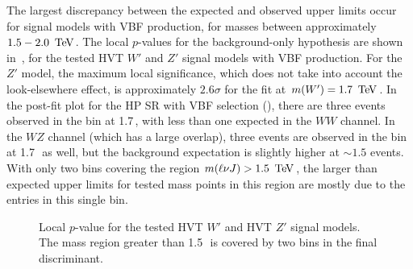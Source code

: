 The largest discrepancy between the expected and observed upper limits occur for signal models with VBF production, for masses between approximately $1.5-2.0\,\TeV$. The local $p$-values for the background-only hypothesis are shown in~\Fig{\ref{fig:p0}},  for the tested HVT $W'$ and $Z'$ signal models with VBF production. For the $Z'$ model, the maximum local significance, which does not take into account the look-elsewhere effect, is approximately $2.6\sigma$ for the fit at $m(W')=1.7\,\TeV$. In the post-fit plot for the HP SR with VBF selection (\Fig{\ref{fig:pf_hp_vbf}}), there are three events observed in the bin at 1.7\,\TeV, with less than one expected in the $WW$ channel. In the $WZ$ channel (which has a large overlap), three events are observed in the bin at 1.7\,\TeV\, as well, but the background expectation is slightly higher at $\sim1.5$ events. With only two bins covering the region $m(\ell\nu J)>1.5\,\TeV$, the larger than expected upper limits for tested mass points in this region are mostly due to the entries in this single bin.


\begin{figure}[H]
\centering
{}
\caption[Local $p$-value for HVT signal (vector boson fusion selection)]{Local $p$-value for the tested \protect{} HVT $W'$ and \protect{} HVT $Z'$ signal models. The mass region greater than 1.5\,\TeV\, is covered by two bins in the final discriminant. }
\label{fig:p0}
\end{figure}

